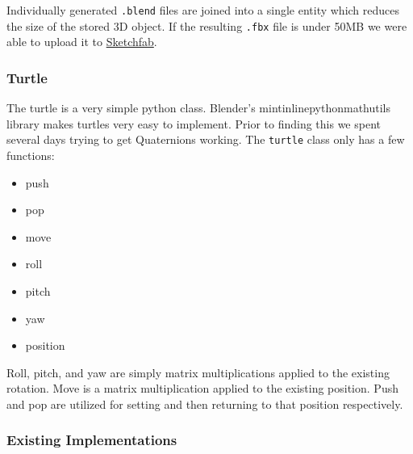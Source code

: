 Individually generated \texttt{.blend} files are joined into a
single entity which reduces the size of the stored 3D object. If the resulting
\texttt{.fbx} file is under 50MB we were able to upload it to
\href{https://sketchfab.com/macattackftw/models}{Sketchfab}.

\subsubsection{Turtle}
The turtle is a very simple python class. Blender's mintinline{python}{mathutils} library makes turtles
very easy to implement. Prior to finding this we spent several days trying to
get Quaternions working. The \texttt{turtle} class only has a few
functions:

\begin{itemize}
    \item push
    \item pop
    \item move
    \item roll
    \item pitch
    \item yaw
    \item position
\end{itemize}

Roll, pitch, and yaw are simply matrix multiplications applied to the existing
rotation. Move is a matrix multiplication applied to the existing position.
Push and pop are utilized for setting and then returning to that position
respectively.


\subsubsection{Existing Implementations}



